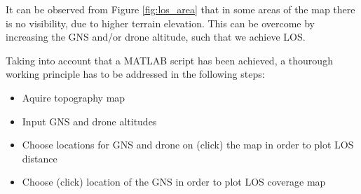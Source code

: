 It can be observed from Figure \ref{fig:los_area} that in some areas of the map there is no visibility, due to higher terrain elevation. This can be overcome by increasing the GNS and/or drone altitude, such that we achieve LOS.  

Taking into account that a MATLAB script has been achieved, a thourough working principle has to be addressed in the following steps:
\begin{itemize}
	\item Aquire topography map 
	\item Input GNS and drone altitudes
	\item Choose locations for GNS and drone on (click) the map in order to plot LOS distance
	\item Choose (click) location of the GNS in order to plot LOS coverage map
\end{itemize}